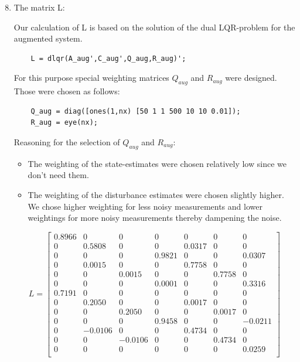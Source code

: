 \documentclass[11pt]{article}
\begin{document}
\begin{enumerate}
    \setcounter{enumi}{7}
    \item The matrix L:
    
    Our calculation of L is based on the solution of the dual LQR-problem for the augmented system.
    
    \begin{verbatim}
    L = dlqr(A_aug',C_aug',Q_aug,R_aug)';
    \end{verbatim}
    
    For this purpose special weighting matrices $Q_{aug}$ and $R_{aug}$ were designed. Those were chosen as follows:
    
    \begin{verbatim}
    Q_aug = diag([ones(1,nx) [50 1 1 500 10 10 0.01]);
    R_aug = eye(nx);
    \end{verbatim}
    
    Reasoning for the selection of $Q_{aug}$ and $R_{aug}$:
    
    \begin{itemize}
    \item The weighting of the state-estimates were chosen relatively low since we don't need them.
    \item The weighting of the disturbance estimates were chosen slightly higher. We chose higher weighting for less noisy measurements and lower weightings for more noisy measurements thereby dampening the noise.
    \end{itemize}
    
    \begin{equation}
    L = \begin{bmatrix} 
    0.8966&0&0&0&0&0&0\\
    0&0.5808&0&0&0.0317&0&0\\
    0&0&0&0.9821&0&0&0.0307\\
    0&0.0015&0&0&0.7758&0&0\\
    0&0&0.0015&0&0&0.7758&0\\
    0&0&0&0.0001&0&0&0.3316\\
    0.7191&0&0&0&0&0&0\\
    0&0.2050&0&0&0.0017&0&0\\
    0&0&0.2050&0&0&0.0017&0\\
    0&0&0&0.9458&0&0&-0.0211\\
    0&-0.0106&0&0&0.4734&0&0\\
    0&0&-0.0106&0&0&0.4734&0\\
    0&0&0&0&0&0&0.0259\\
    \end{bmatrix}
    \end{equation}
    

\end{enumerate}
\end{document}
